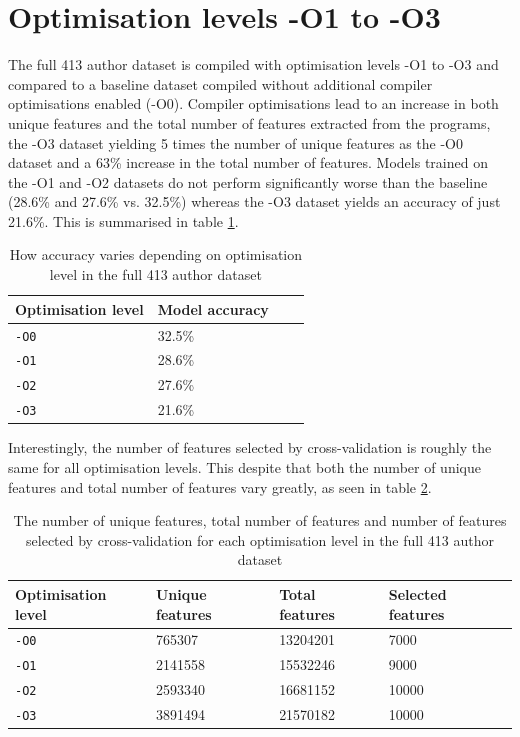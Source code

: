 \documentclass[a4paper,11pt]{kth-mag}
\begin{document}
\section{Optimisation levels -O1 to -O3}
The full 413 author dataset is compiled with optimisation levels -O1 to -O3 and
compared to a baseline dataset compiled without additional compiler
optimisations enabled (-O0). Compiler optimisations lead to an increase in both
unique features and the total number of features extracted from the programs,
the -O3 dataset yielding 5 times the number of unique features as the -O0
dataset and a 63\% increase in the total number of features. Models trained on
the -O1 and -O2 datasets do not perform significantly worse than the baseline
(28.6\% and 27.6\%  vs. 32.5\%) whereas the -O3 dataset yields an accuracy of just 21.6\%.
This is summarised in table \ref{tab:413-results}.

\begin{table}[!htb]
    \centering
    \caption{How accuracy varies depending on optimisation level in the full
    413 author dataset}
        \begin{tabular}{ l l l l }
        Optimisation level & Model accuracy \\
        \hline
        \lstinline{-O0} & 32.5\% \\
        \lstinline{-O1} & 28.6\% \\
        \lstinline{-O2} & 27.6\% \\
        \lstinline{-O3} & 21.6\%
        \end{tabular}

    \label{tab:413-results}
\end{table}

Interestingly, the number of features selected by cross-validation is roughly
the same for all optimisation levels. This despite that both the number of
unique features and total number of features vary greatly, as seen in table
\ref{tab:413-results-features}.

\begin{table}[!htb]
    \centering
    \caption{The number of unique features, total number of features and number
    of features selected by cross-validation for each optimisation level in the
    full 413 author dataset}
        \begin{tabular}{ l l l l }
        Optimisation level & Unique features & Total features &
        Selected features \\ \hline
        \lstinline{-O0} & 765307 & 13204201 & 7000 \\
        \lstinline{-O1} & 2141558 & 15532246 & 9000 \\
        \lstinline{-O2} & 2593340 & 16681152 & 10000 \\
        \lstinline{-O3} & 3891494 & 21570182 & 10000
        \end{tabular}
        \label{tab:413-results-features}
\end{table}
\end{document}
